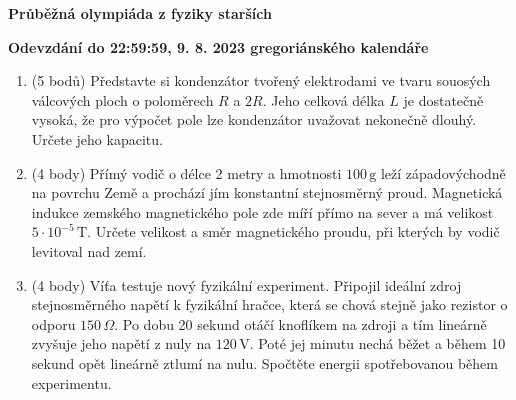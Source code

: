 \documentclass[12pt,a4paper]{article}
\begin{document}
\newpage
\begin{center}
    \textbf{\Large Průběžná olympiáda z fyziky starších}
    \vspace{1em}
    
    \textbf{Odevzdání do 22:59:59, 9. 8. 2023 gregoriánského kalendáře}
\end{center}

\begin{enumerate}[resume,label=\arabic*)]

\item (5 bodů) Představte si kondenzátor tvořený elektrodami ve tvaru souosých válcových ploch o poloměrech $R$ a $2R$. Jeho celková délka $L$ je dostatečně vysoká, že pro výpočet pole lze kondenzátor uvažovat nekonečně dlouhý. Určete jeho kapacitu.

\item (4 body) Přímý vodič o délce 2 metry a hmotnosti $100\,\mathrm{g}$ leží západovýchodně na povrchu Země a prochází jím konstantní stejnosměrný proud. Magnetická indukce zemského magnetického pole zde míří přímo na sever a má velikost $5\cdot 10^{-5}\,\mathrm{T}$. Určete velikost a směr magnetického proudu, při kterých by vodič levitoval nad zemí.

\item (4 body) Víťa testuje nový fyzikální experiment. Připojil ideální zdroj stejnosměrného napětí k fyzikální hračce, která se chová stejně jako rezistor o odporu $150\,\Omega$. Po dobu 20 sekund otáčí knoflíkem na zdroji a tím lineárně zvyšuje jeho napětí z nuly na $120\,\mathrm{V}$. Poté jej minutu nechá běžet a během 10 sekund opět lineárně ztlumí na nulu. Spočtěte energii spotřebovanou během experimentu.

\end{enumerate}
\end{document}
